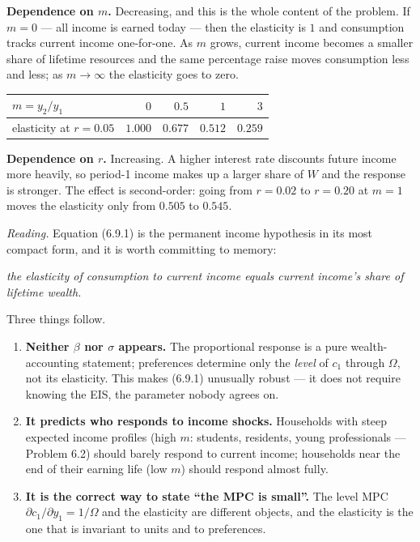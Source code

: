 \documentclass[12pt, letterpaper]{article}
\begin{document}
\begin{tcolorbox}[oddbox,title={Problem 6.9 \quad The Marginal Propensity to Consume in Proportional Terms}]
\begin{enumerate}
\smallskip
\textbf{Dependence on $m$.} Decreasing, and this is the whole content of the problem. If
$m=0$ --- all income is earned today --- then the elasticity is $1$ and consumption tracks
current income one-for-one. As $m$ grows, current income becomes a smaller share of lifetime
resources and the same percentage raise moves consumption less and less; as $m\to\infty$ the
elasticity goes to zero.
\begin{center}
\begin{tabular}{@{}lrrrr@{}}
\toprule
$m=y_2/y_1$ & $0$ & $0.5$ & $1$ & $3$ \\
\midrule
elasticity at $r=0.05$ & $1.000$ & $0.677$ & $0.512$ & $0.259$ \\
\bottomrule
\end{tabular}
\end{center}

\smallskip
\textbf{Dependence on $r$.} Increasing. A higher interest rate discounts future income more
heavily, so period-1 income makes up a larger share of $W$ and the response is stronger. The
effect is second-order: going from $r=0.02$ to $r=0.20$ at $m=1$ moves the elasticity only
from $0.505$ to $0.545$.

\end{enumerate}

\smallskip
\emph{Reading.} Equation (6.9.1) is the permanent income hypothesis in its most compact
form, and it is worth committing to memory:
\begin{center}
\emph{the elasticity of consumption to current income equals current income's share of
lifetime wealth.}
\end{center}
Three things follow.
\begin{enumerate}[label=\textbf{\arabic*.},leftmargin=1.6em,itemsep=3pt,topsep=3pt]
\item \textbf{Neither $\beta$ nor $\sigma$ appears.} The proportional response is a pure
      wealth-accounting statement; preferences determine only the \emph{level} of $c_1$
      through $\Omega$, not its elasticity. This makes (6.9.1) unusually robust --- it does
      not require knowing the EIS, the parameter nobody agrees on.
\item \textbf{It predicts who responds to income shocks.} Households with steep expected
      income profiles (high $m$: students, residents, young professionals --- Problem 6.2)
      should barely respond to current income; households near the end of their earning life
      (low $m$) should respond almost fully.
\item \textbf{It is the correct way to state ``the MPC is small''.} The level MPC
      $\partial c_1/\partial y_1=1/\Omega$ and the elasticity are different objects, and the
      elasticity is the one that is invariant to units and to preferences.
\end{enumerate}
\end{tcolorbox}
\end{document}
